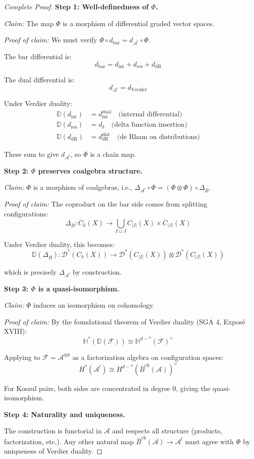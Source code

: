 \begin{proof}[Complete Proof]
\textbf{Step 1: Well-definedness of $\Phi$.}

\emph{Claim:} The map $\Phi$ is a morphism of differential graded vector spaces.

\emph{Proof of claim:} We must verify $\Phi \circ d_{\text{bar}} = d_{\mathcal{A}^!} \circ \Phi$.

The bar differential is:
$$d_{\text{bar}} = d_{\text{int}} + d_{\text{res}} + d_{\text{dR}}$$

The dual differential is:
$$d_{\mathcal{A}^!} = d_{\text{Verdier}}$$

Under Verdier duality:
\begin{align*}
\mathbb{D}(d_{\text{int}}) &= d_{\text{int}}^{\text{dual}} \quad \text{(internal differential)}\\
\mathbb{D}(d_{\text{res}}) &= d_{\delta} \quad \text{(delta function insertion)}\\
\mathbb{D}(d_{\text{dR}}) &= d_{\text{dR}}^{\text{dist}} \quad \text{(de Rham on distributions)}
\end{align*}

These sum to give $d_{\mathcal{A}^!}$, so $\Phi$ is a chain map.

\textbf{Step 2: $\Phi$ preserves coalgebra structure.}

\emph{Claim:} $\Phi$ is a morphism of coalgebras, i.e., $\Delta_{\mathcal{A}^!} \circ \Phi = (\Phi \otimes \Phi) \circ \Delta_{\bar{B}}$.

\emph{Proof of claim:} The coproduct on the bar side comes from splitting configurations:
$$\Delta_{\bar{B}}: \overline{C}_k(X) \to \bigcup_{I \sqcup J} \overline{C}_{|I|}(X) \times \overline{C}_{|J|}(X)$$

Under Verdier duality, this becomes:
$$\mathbb{D}(\Delta_{\bar{B}}): \mathcal{D}^*(C_k(X)) \to \mathcal{D}^*(C_{|I|}(X)) \otimes \mathcal{D}^*(C_{|J|}(X))$$

which is precisely $\Delta_{\mathcal{A}^!}$ by construction.

\textbf{Step 3: $\Phi$ is a quasi-isomorphism.}

\emph{Claim:} $\Phi$ induces an isomorphism on cohomology.

\emph{Proof of claim:} By the foundational theorem of Verdier duality (SGA 4, Exposé XVIII):
$$\mathbb{H}^*(\mathbb{D}(\mathcal{F})) \cong \mathbb{H}^{d-*}(\mathcal{F})^{\vee}$$

Applying to $\mathcal{F} = \mathcal{A}^{\otimes k}$ as a factorization algebra on configuration spaces:
$$H^*(\mathcal{A}^!) \cong H^{d-*}(\bar{B}^{\text{ch}}(\mathcal{A}))^{\vee}$$

For Koszul pairs, both sides are concentrated in degree 0, giving the quasi-isomorphism.

\textbf{Step 4: Naturality and uniqueness.}

The construction is functorial in $\mathcal{A}$ and respects all structure (products, factorization, etc.). Any other natural map $\bar{B}^{\text{ch}}(\mathcal{A}) \to \mathcal{A}^!$ must agree with $\Phi$ by uniqueness of Verdier duality.
\end{proof}

